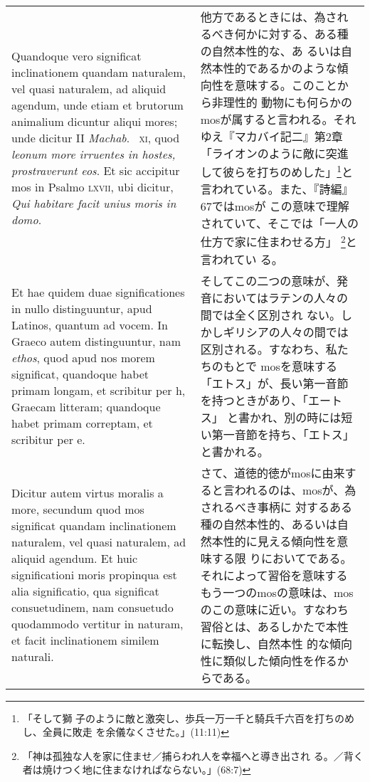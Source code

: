 \documentclass[10pt]{jsarticle}
\begin{document}
\begin{longtable}{p{21em}p{21em}}
Quandoque vero significat inclinationem quandam naturalem, vel quasi
naturalem, ad aliquid agendum, unde etiam et brutorum animalium
dicuntur aliqui mores; unde dicitur II {\itshape Machab}.~{\scshape
xi}, quod {\itshape leonum more irruentes in hostes, prostraverunt
eos}. Et sic accipitur mos in Psalmo {\scshape lxvii}, ubi dicitur,
{\itshape Qui habitare facit unius moris in domo}.

&

他方であるときには、為されるべき何かに対する、ある種の自然本性的な、あ
るいは自然本性的であるかのような傾向性を意味する。このことから非理性的
動物にも何らかのmosが属すると言われる。それゆえ『マカバイ記二』第2章
「ライオンのように敵に突進して彼らを打ちのめした」\footnote{「そして獅
子のように敵と激突し、歩兵一万一千と騎兵千六百を打ちのめし、全員に敗走
を余儀なくさせた。」(11:11)}と言われている。また、『詩編』67ではmosが
この意味で理解されていて、そこでは「一人の仕方で家に住まわせる方」
\footnote{「神は孤独な人を家に住ませ／捕らわれ人を幸福へと導き出され
る。／背く者は焼けつく地に住まなければならない。」(68:7)}と言われてい
る。

\\

Et hae quidem duae
significationes in nullo distinguuntur, apud Latinos, quantum ad
vocem. In Graeco autem distinguuntur, nam {\itshape ethos}, quod apud
nos morem significat, quandoque habet primam longam, et scribitur per
\textgreek{h}, Graecam litteram; quandoque habet primam correptam, et
scribitur per \textgreek{e}.

&

そしてこの二つの意味が、発音においてはラテンの人々の間では全く区別され
ない。しかしギリシアの人々の間では区別される。すなわち、私たちのもとで
mosを意味する「エトス」が、長い第一音節を持つときがあり、「エートス」
と書かれ、別の時には短い第一音節を持ち、「エトス」と書かれる。

\\

Dicitur autem virtus moralis a more, secundum quod mos significat
quandam inclinationem naturalem, vel quasi naturalem, ad aliquid
agendum.  Et huic significationi moris propinqua est alia
significatio, qua significat consuetudinem, nam consuetudo quodammodo
vertitur in naturam, et facit inclinationem similem
naturali. 

&

さて、道徳的徳がmosに由来すると言われるのは、mosが、為されるべき事柄に
対するある種の自然本性的、あるいは自然本性的に見える傾向性を意味する限
りにおいてである。それによって習俗を意味するもう一つのmosの意味は、mos
のこの意味に近い。すなわち習俗とは、あるしかたで本性に転換し、自然本性
的な傾向性に類似した傾向性を作るからである。


\end{longtable}
\end{document}
